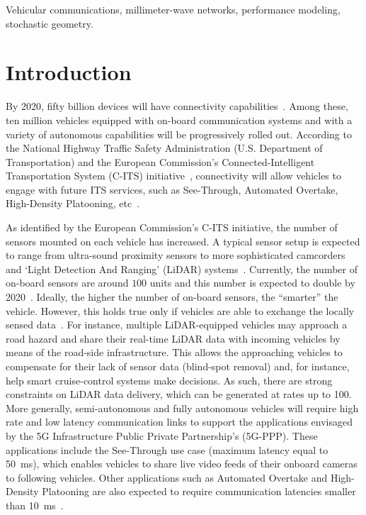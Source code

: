 \documentclass[10pt,journal,a4paper]{IEEEtran}
\begin{document}
\begin{IEEEkeywords}Vehicular communications, millimeter-wave networks, performance modeling, stochastic geometry.\end{IEEEkeywords}

\section{Introduction}\label{sec:intro}
By 2020, fifty billion devices will have connectivity capabilities~\cite{cisco}. Among these, ten million vehicles equipped with on-board communication systems and with a variety of autonomous capabilities will be progressively rolled out. According to the National Highway Traffic Safety Administration (U.S. Department of Transportation) and the European Commission's Connected-Intelligent Transportation System (C-ITS) initiative~\cite{NHTSA,C_ITS}, connectivity will allow vehicles to engage with future ITS services, such as See-Through, Automated Overtake, High-Density Platooning, etc~\cite{5G-PPP}.

As identified by the European Commission's C-ITS initiative, the number of sensors mounted on each vehicle has increased. A typical sensor setup is expected to range from ultra-sound proximity sensors to more sophisticated camcorders and `Light Detection And Ranging' (LiDAR) systems~\cite{5G-PPP}. Currently, the number of on-board sensors are around $100$ units and this number is expected to double by 2020~\cite{RR0.3}. Ideally, the higher the number of on-board sensors, the ``smarter'' the vehicle. However, this holds true only if vehicles are able to exchange the locally sensed data~\cite{R2}. For instance, multiple LiDAR-equipped vehicles may approach a road hazard and share their real-time LiDAR data with incoming vehicles by means of the road-side infrastructure. This allows the approaching vehicles to compensate for their lack of sensor data (blind-spot removal) and, for instance, help smart cruise-control systems make decisions.
As such, there are strong constraints on LiDAR data delivery, which can be generated at rates up to \SI{100}{\Mbps}.
More generally, semi-autonomous and fully autonomous vehicles will require high rate and low latency communication links to support the applications envisaged by the 5G Infrastructure Public Private Partnership's (5G-PPP). These applications include the See-Through use case (maximum latency equal to \SI{50}{\milli\second}), which enables vehicles to share live video feeds of their onboard cameras to following vehicles. Other applications such as Automated Overtake and High-Density Platooning are also expected to require communication latencies smaller than \SI{10}{\milli\second}~\cite[Table~1]{5G-PPP}.
\end{document}

